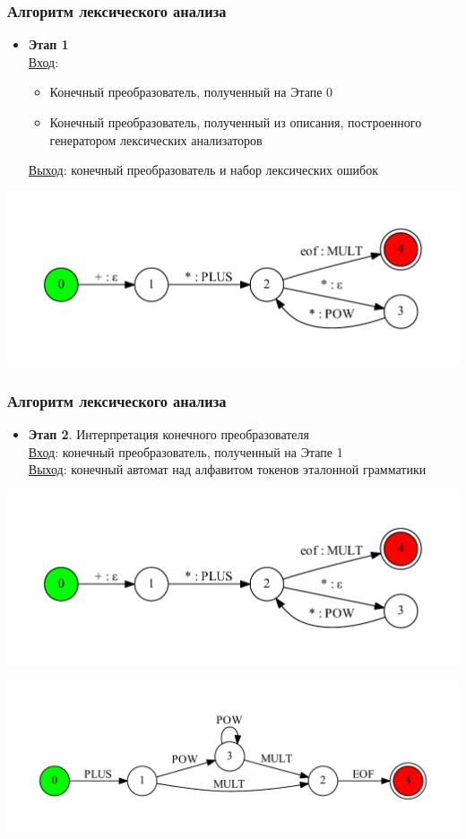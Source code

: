 \documentclass{beamer}
\begin{document}
\begin{frame}[fragile]
\transwipe[direction=90]
\frametitle{Алгоритм лексического анализа}
\begin{itemize}
\item \textbf{Этап 1}\\
\underline{Вход}: \\ 
\begin{itemize}
\item Конечный преобразователь, полученный на Этапе 0
\item Конечный преобразователь, полученный из описания, построенного генератором лексических анализаторов
\end{itemize}
\underline{Выход}: конечный преобразователь и набор лексических ошибок
\end{itemize}

\begin{center}
 \includegraphics[width=0.6\linewidth]{calc_ex_compose_1}
\end{center} 

\end{frame}

\begin{frame}[fragile]
\transwipe[direction=90]
\frametitle{Алгоритм лексического анализа}
\begin{itemize}
\item \textbf{Этап 2}. Интерпретация конечного преобразователя \\
\underline{Вход}: конечный преобразователь, полученный на Этапе 1 \\
\underline{Выход}: конечный автомат над алфавитом токенов эталонной грамматики \\
\end{itemize}

\begin{center}
 \includegraphics[width=0.6\linewidth]{calc_ex_compose_1}
\end{center} 

\begin{center}      
    \includegraphics[width=0.8\linewidth]{calc_ex_res}    
\end{center} 
\end{frame}
\end{document}
